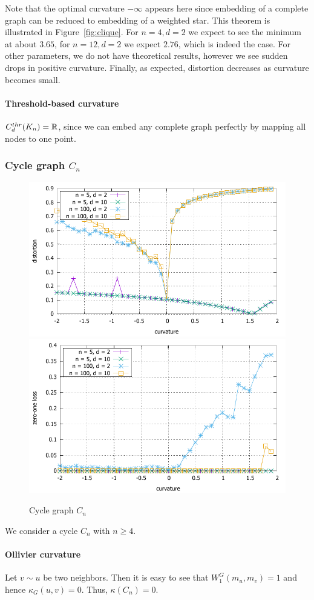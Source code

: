 \documentclass{article} %
\begin{document}
Note that the optimal curvature $-\infty$ appears here since embedding of a complete graph can be reduced to embedding of a weighted star.
This theorem is illustrated in Figure~\ref{fig:clique}. For $n = 4, d = 2$ we expect to see the minimum at about $3.65$, for $n = 12, d = 2$ we expect $2.76$, which is indeed the case. For other parameters, we do not have theoretical results, however we see sudden drops in positive curvature. Finally, as expected, distortion decreases as curvature becomes small. 

\paragraph{Threshold-based curvature} 
$C_d^{thr}(K_n) = \mathbb{R}$, since we can embed any complete graph perfectly by mapping all nodes to one point. 

\subsubsection{Cycle graph $C_n$} 

\begin{figure}
    \centering
    \includegraphics[width = 0.49 \textwidth]{cycle_distortion.pdf}
    \includegraphics[width = 0.49 \textwidth]{cycle_zero_one.pdf}
    \caption{Cycle graph $C_{n}$}
    \label{fig:cycle}
\end{figure}

We consider a cycle $C_n$ with $n \ge 4$.

\paragraph{Ollivier curvature}  
Let $v \sim u$ be two neighbors. Then it is easy to see that $W_1^G(m_u,m_v) = 1$ and hence $\kappa_G(u,v) = 0$. Thus, $\kappa(C_n) = 0$.
\end{document}
